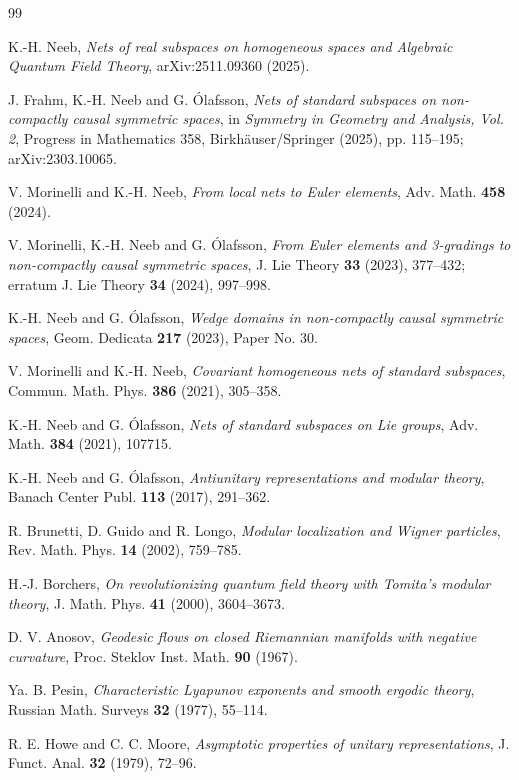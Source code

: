 \documentclass[11pt]{article}
\theoremstyle{definition}
\begin{document}
\begin{thebibliography}{99}

K.-H. Neeb,
\emph{Nets of real subspaces on homogeneous spaces and Algebraic Quantum Field Theory},
arXiv:2511.09360 (2025).

J. Frahm, K.-H. Neeb and G. \'Olafsson,
\emph{Nets of standard subspaces on non-compactly causal symmetric spaces},
in \emph{Symmetry in Geometry and Analysis, Vol. 2},
Progress in Mathematics 358, Birkh\"auser/Springer (2025), pp. 115--195;
arXiv:2303.10065.

V. Morinelli and K.-H. Neeb,
\emph{From local nets to Euler elements},
Adv. Math. \textbf{458} (2024).

V. Morinelli, K.-H. Neeb and G. \'Olafsson,
\emph{From Euler elements and 3-gradings to non-compactly causal symmetric spaces},
J. Lie Theory \textbf{33} (2023), 377--432;
erratum J. Lie Theory \textbf{34} (2024), 997--998.

K.-H. Neeb and G. \'Olafsson,
\emph{Wedge domains in non-compactly causal symmetric spaces},
Geom. Dedicata \textbf{217} (2023), Paper No. 30.

V. Morinelli and K.-H. Neeb,
\emph{Covariant homogeneous nets of standard subspaces},
Commun. Math. Phys. \textbf{386} (2021), 305--358.

K.-H. Neeb and G. \'Olafsson,
\emph{Nets of standard subspaces on Lie groups},
Adv. Math. \textbf{384} (2021), 107715.

K.-H. Neeb and G. \'Olafsson,
\emph{Antiunitary representations and modular theory},
Banach Center Publ. \textbf{113} (2017), 291--362.

R. Brunetti, D. Guido and R. Longo,
\emph{Modular localization and Wigner particles},
Rev. Math. Phys. \textbf{14} (2002), 759--785.

H.-J. Borchers,
\emph{On revolutionizing quantum field theory with Tomita's modular theory},
J. Math. Phys. \textbf{41} (2000), 3604--3673.

D. V. Anosov,
\emph{Geodesic flows on closed Riemannian manifolds with negative curvature},
Proc. Steklov Inst. Math. \textbf{90} (1967).

Ya. B. Pesin,
\emph{Characteristic Lyapunov exponents and smooth ergodic theory},
Russian Math. Surveys \textbf{32} (1977), 55--114.

R. E. Howe and C. C. Moore,
\emph{Asymptotic properties of unitary representations},
J. Funct. Anal. \textbf{32} (1979), 72--96.

\end{thebibliography}
\end{document}
